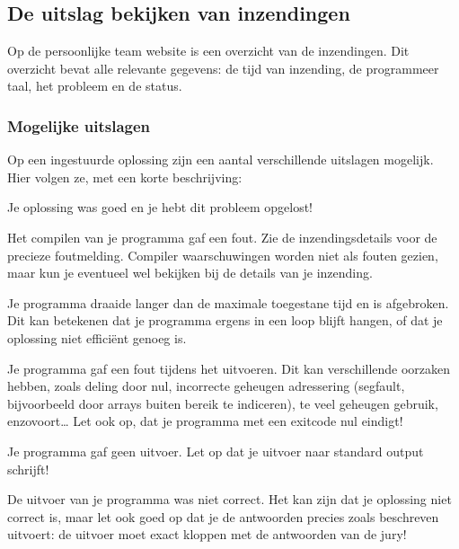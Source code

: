 \documentclass[11pt,titlepage,a4paper]{article}
\begin{document}
\subsection{De uitslag bekijken van inzendingen}

Op de persoonlijke team website is een overzicht van de inzendingen.
Dit overzicht bevat alle relevante gegevens: de tijd van inzending, de
programmeer taal, het probleem en de status.

\subsubsection{Mogelijke uitslagen}

Op een ingestuurde oplossing zijn een aantal verschillende uitslagen
mogelijk. Hier volgen ze, met een korte beschrijving:

\begin{description}[\setleftmargin{4.5cm}]
\item[CORRECT]
Je oplossing was goed en je hebt dit probleem opgelost!

\item[COMPILER-ERROR]
Het compilen van je programma gaf een fout. Zie de inzendingsdetails
voor de precieze foutmelding. Compiler waarschuwingen worden niet als
fouten gezien, maar kun je eventueel wel bekijken bij de details van
je inzending.

\item[TIMELIMIT]
Je programma draaide langer dan de maximale toegestane tijd en is
afgebroken. Dit kan betekenen dat je programma ergens in een loop
blijft hangen, of dat je oplossing niet effici\"ent genoeg is.

\item[RUN-ERROR]
Je programma gaf een fout tijdens het uitvoeren. Dit kan verschillende
oorzaken hebben, zoals deling door nul, incorrecte geheugen adressering
(segfault, bijvoorbeeld door arrays buiten bereik te indiceren), te
veel geheugen gebruik, enzovoort\dots
Let ook op, dat je programma met een exitcode nul eindigt!

\item[NO-OUTPUT]
Je programma gaf geen uitvoer. Let op dat je uitvoer naar standard
output schrijft!

\item[WRONG-ANSWER]
De uitvoer van je programma was niet correct. Het kan zijn dat je
oplossing niet correct is, maar let ook goed op dat je de antwoorden
precies zoals beschreven uitvoert: de uitvoer moet exact kloppen met
de antwoorden van de jury!

\end{description}
\end{document}
